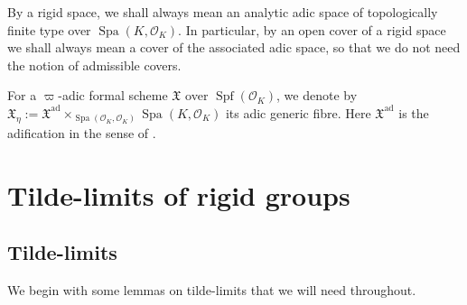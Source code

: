 \documentclass[10pt,oneside]{amsart}
\theoremstyle{definition}
\begin{document}
	By a rigid space, we shall always mean an analytic adic space of topologically finite type over $\operatorname{Spa}(K,\mathcal O_K)$. 
	In particular, by an open cover of a rigid space we shall always mean a cover of the associated adic space, so that we do not need the notion of admissible covers.
	
	For a $\varpi$-adic formal scheme $\mathfrak X$ over $\operatorname{Spf}(\mathcal O_K)$, we denote by $\mathfrak X_\eta:=\mathfrak X^{\mathrm{ad}}\times_{\operatorname{Spa}(\mathcal O_K,\mathcal O_K)}\operatorname{Spa}(K,\mathcal O_K)$ its adic generic fibre. Here $\mathfrak X^{\mathrm{ad}}$ is the adification in the sense of \cite{SW}.


	
	\section{Tilde-limits of rigid groups} \label{section:tilde_limit}
  
	

		\subsection{Tilde-limits} 
	We begin with some lemmas on tilde-limits that we will need throughout.
		
\end{document}
